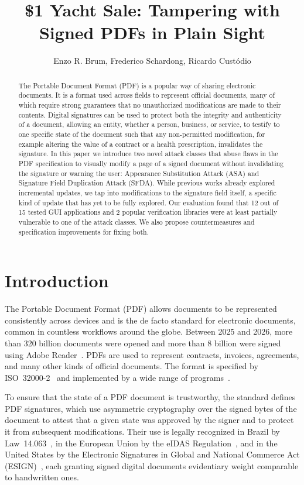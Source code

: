 \documentclass[12pt]{article}
\title{\$1 Yacht Sale: Tampering with Signed PDFs in Plain Sight}
\author{Enzo R. Brum\inst{1}, Frederico Schardong\inst{1}, Ricardo Custódio\inst{1}}
\begin{document}
\maketitle

\begin{abstract}
	The Portable Document Format (PDF) is a popular way of sharing electronic documents. It is a format used across fields to represent official documents, many of which require strong guarantees that no unauthorized modifications are made to their contents. Digital signatures can be used to protect both the integrity and authenticity of a document, allowing an entity, whether a person, business, or service, to testify to one specific state of the document such that any non-permitted modification, for example altering the value of a contract or a health prescription, invalidates the signature. In this paper we introduce two novel attack classes that abuse flaws in the PDF specification to visually modify a page of a signed document without invalidating the signature or warning the user: Appearance Substitution Attack (ASA) and Signature Field Duplication Attack (SFDA). While previous works already explored incremental updates, we tap into modifications to the signature field itself, a specific kind of update that has yet to be fully explored. Our evaluation found that 12 out of 15 tested GUI applications and 2 popular verification libraries were at least partially vulnerable to one of the attack classes. We also propose countermeasures and specification improvements for fixing both.


\end{abstract}


\section{Introduction}

The Portable Document Format (PDF) allows documents to be represented consistently across devices and is the de facto standard for electronic documents, common in countless workflows around the globe. Between 2025 and 2026, more than 320 billion documents were opened and more than 8 billion were signed using Adobe Reader~\cite{adobe-sign-2026}. PDFs are used to represent contracts, invoices, agreements, and many other kinds of official documents. The format is specified by ISO~32000-2~\cite{iso32000-2} and implemented by a wide range of programs~\cite{adobereader,foxitreader,libreoffice}.

To ensure that the state of a PDF document is trustworthy, the standard defines PDF signatures, which use asymmetric cryptography over the signed bytes of the document to attest that a given state was approved by the signer and to protect it from subsequent modifications. Their use is legally recognized in Brazil by Law~14.063~\cite{lei14063}, in the European Union by the eIDAS Regulation~\cite{eidas2014}, and in the United States by the Electronic Signatures in Global and National Commerce Act (ESIGN)~\cite{esign2000}, each granting signed digital documents evidentiary weight comparable to handwritten ones.
\end{document}
